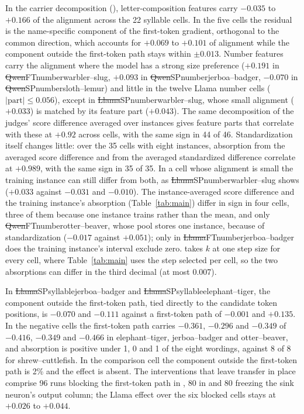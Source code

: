 In the carrier decomposition (\edtab{\ref{tab:ed-chan}}), letter-composition features carry $-0.035$ to $+0.166$ of the alignment across the 22 syllable cells. In the five  cells the residual is the name-specific component of the first-token gradient, orthogonal to the common direction, which accounts for $+0.069$ to $+0.101$ of alignment while the component outside the first-token path stays within $\pm0.013$. Number features carry the alignment where the model has a strong size preference ($+0.191$ in \st{Qwen}{FT}{number}{warbler--slug}, $+0.093$ in \st{Qwen}{SP}{number}{jerboa--badger}, $-0.070$ in \st{Qwen}{SP}{number}{sloth--lemur}) and little in the twelve Llama number cells ($|\text{part}|\leq0.056$), except in \st{Llama}{SP}{number}{warbler--slug}, whose small alignment ($+0.033$) is matched by its feature part ($+0.043$). The same decomposition of the judges' score difference averaged over instances gives feature parts that correlate with these at $+0.92$ across cells, with the same sign in 44 of 46. Standardization itself changes little: over the 35 cells with eight instances, absorption from the averaged score difference and from the averaged standardized difference correlate at $+0.989$, with the same sign in 35 of 35. In a cell whose alignment is small the training instance can still differ from both, as \st{Llama}{SP}{number}{warbler--slug} shows ($+0.033$ against $-0.031$ and $-0.010$). The instance-averaged score difference and the training instance's absorption (Table~\ref{tab:main}) differ in sign in four cells, three of them because one instance trains rather than the mean, and only \st{Qwen}{FT}{number}{otter--beaver}, whose pool stores one instance, because of standardization ($-0.017$ against $+0.051$); only in \st{Llama}{FT}{number}{jerboa--badger} does the training instance's interval exclude zero. \edtab{\ref{tab:ed-chan}} takes $k$ at one step size for every cell, where Table~\ref{tab:main} uses the step selected per cell, so the two absorptions can differ in the third decimal (at most 0.007).

In \st{Llama}{SP}{syllable}{jerboa--badger} and \st{Llama}{SP}{syllable}{elephant--tiger}, the component outside the first-token path, tied directly to the candidate token positions, is $-0.070$ and $-0.111$ against a first-token path of $-0.001$ and $+0.135$. In the negative  cells the first-token path carries $-0.361$, $-0.296$ and $-0.349$ of $-0.416$, $-0.349$ and $-0.466$ in elephant--tiger, jerboa--badger and otter--beaver, and absorption is positive under 1, 0 and 1 of the eight wordings, against 8 of 8 for shrew--cuttlefish. In the  comparison cell the component outside the first-token path is 2\% and the effect is absent. The interventions that leave transfer in place comprise 96 runs blocking the first-token path in , 80 in  and 80 freezing the sink neuron's output column; the Llama effect over the six blocked cells stays at $+0.026$ to $+0.044$.

